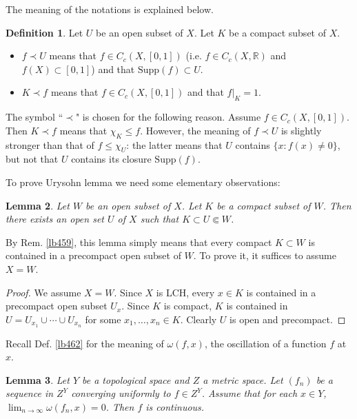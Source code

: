 \documentclass[12pt,b5paper,notitlepage]{article}
\theoremstyle{definition}
\newtheorem{df}{Definition}[section]
\theoremstyle{plain}
\newtheorem{lm}[df]{Lemma}
\newcommand{\Rbb}{\mathbb R}
\newcommand{\Supp}{\mathrm{Supp}}
\numberwithin{equation}{section}
\begin{document}
The meaning of the notations is explained below.

\begin{df}
Let $U$ be an open subset of $X$. Let $K$ be a compact subset of $X$.
\begin{itemize}
\item $f\prec U$ means that $f\in C_c(X,[0,1])$  (i.e. $f\in C_c(X,\Rbb)$ and $f(X)\subset[0,1]$) and that $\Supp(f)\subset U$.
\item $K\prec f$ means that $f\in C_c(X,[0,1])$ and that $f|_K=1$.
\end{itemize} 
\end{df}
 

The symbol ``$\prec$" is chosen for the following reason. Assume $f\in C_c(X,[0,1])$. Then $K\prec f$ means that $\chi_K\leq f$. However, the meaning of $f\prec U$ is slightly stronger than that of $f\leq \chi_U$: the latter means that $U$ contains $\{x:f(x)\neq0\}$, but not that $U$ contains its closure $\Supp(f)$.


To prove Urysohn lemma we need some elementary observations:







\begin{lm}\label{lb460}
Let $W$ be an open subset of $X$. Let $K$ be a compact subset of $W$. Then there exists an open set $U$ of $X$ such that $K\subset U\Subset W$. 
\end{lm}


By Rem. \ref{lb459}, this lemma simply means that every compact $K\subset W$ is contained in a precompact open subset of $W$. To prove it, it suffices to assume $X=W$.


\begin{proof}
We assume $X=W$. Since $X$ is LCH, every $x\in K$ is contained in a precompact open subset $U_x$. Since $K$ is compact, $K$ is contained in $U=U_{x_1}\cup\cdots\cup U_{x_n}$ for some $x_1,\dots,x_n\in K$. Clearly $U$ is open and precompact.
\end{proof}


Recall Def. \ref{lb462} for the meaning of $\omega(f,x)$, the oscillation of a function $f$ at $x$.

\begin{lm}\label{lb463}
Let $Y$ be a topological space and $Z$ a metric space. Let $(f_n)$ be a sequence in $Z^Y$ converging uniformly to $f\in Z^Y$. Assume that for each $x\in Y$, $\lim_{n\rightarrow\infty}\omega(f_n,x)=0$. Then $f$ is continuous.
\end{lm}
\end{document}
